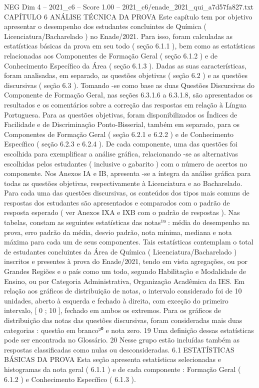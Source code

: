 \begin{textsample}{NEG Dim 4 – 2021\_c6 – Score 1.00 – 2021\_c6/enade\_2021\_qui\_a7d57fa827.txt}  \label{ex:f4_neg_294}
CAPÍTULO 6 ANÁLISE TÉCNICA DA PROVA Este capítulo tem por objetivo apresentar o desempenho dos estudantes concluintes de Química ( Licenciatura/Bacharelado ) no Enade/2021.
Para isso, foram calculadas as estatísticas básicas da prova em seu todo ( seção 6.1.1 ), bem como as estatísticas relacionadas aos Componentes de Formação Geral ( seção 6.1.2 ) e de Conhecimento Específico da Área ( seção 6.1.3 ).
Dadas as suas características, foram analisadas, em separado, as questões objetivas ( seção 6.2 ) e as questões discursivas ( seção 6.3 ).
Tomando -se como base as duas Questões Discursivas do Componente de Formação Geral, nas seções 6.3.1.6 a 6.3.1.8, são apresentados os resultados e os comentários sobre a correção das respostas em relação à Língua Portuguesa.
Para as questões objetivas, foram disponibilizados os Índices de Facilidade e de Discriminação Ponto-Bisserial, também em separado, para os Componentes de Formação Geral ( seção 6.2.1 e 6.2.2 ) e de Conhecimento Específico ( seção 6.2.3 e 6.2.4 ).
De cada componente, uma das questões foi escolhida para exemplificar a análise gráfica, relacionando -se as alternativas escolhidas pelos estudantes ( inclusive o gabarito ) com o número de acertos no componente.
Nos Anexos IA e IB, apresenta -se a íntegra da análise gráfica para todas as questões objetivas, respectivamente à Licenciatura e ao Bacharelado.
Para cada uma das questões discursivas, os conteúdos dos tipos mais comuns de respostas dos estudantes são apresentados e comparados com o padrão de resposta esperado ( ver Anexos IXA e IXB com o padrão de respostas ).
Nas tabelas, constam as seguintes estatísticas das notas¹⁹ : média do desempenho na prova, erro padrão da média, desvio padrão, nota mínima, mediana e nota máxima para cada um de seus componentes.
Tais estatísticas contemplam o total de estudantes concluintes da Área de Química ( Licenciatura/Bacharelado ) inscritos e presentes à prova do Enade/2021, tendo em vista agregações, ou por Grandes Regiões e o país como um todo, segundo Habilitação e Modalidade de Ensino, ou por Categoria Administrativa, Organização Acadêmica da IES.
Em relação aos gráficos de distribuição de notas, o intervalo considerado foi de 10 unidades, aberto à esquerda e fechado à direita, com exceção do primeiro intervalo, [ 0 ; 10 ], fechado em ambos os extremos.
Para os gráficos de distribuição das notas das questões discursivas, foram consideradas mais duas categorias : questão em branco²⁰ e nota zero. 19 Uma definição dessas estatísticas pode ser encontrada no Glossário. 20 Nesse grupo estão incluídas também as respostas classificadas como nulas ou desconsideradas. 6.1 ESTATÍSTICAS BÁSICAS DA PROVA Esta seção apresenta estatísticas selecionadas e histogramas da nota geral ( 6.1.1 ) e de cada componente : Formação Geral ( 6.1.2 ) e Conhecimento Específico ( 6.1.3 ).

\end{textsample}
